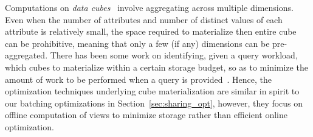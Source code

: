 


Computations on {\em data cubes}~\cite{DBLP:jounral/DMKD/GrayCBLR97}
involve aggregating across multiple dimensions.
Even when the number of attributes and number
of distinct values of each attribute is relatively small,
the space required to materialize then entire cube can be prohibitive,
meaning that only a few (if any) dimensions can be pre-aggregated.
There has been some work on identifying, given a query workload,
which cubes to materialize within a certain storage budget,
so as to minimize the amount of work to be performed when a
query is provided~\cite{DBLP:conf/VLDB/AgarwalADG96,DBLP:conf/SIGMOD/HarinarayanRU96}.
Hence, the optimization techniques underlying cube materialization 
are similar in spirit to our batching optimizations in Section~\ref{sec:sharing_opt},
however, they focus on offline computation of views to minimize storage rather than efficient online
optimization.




